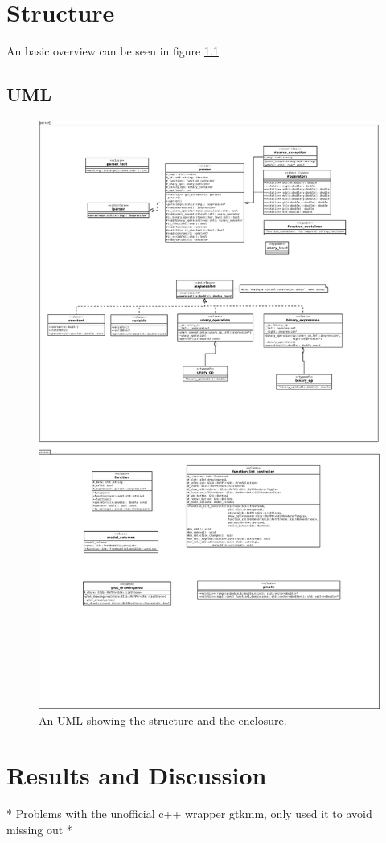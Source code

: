 \documentclass[a4paper,11pt]{kth-mag}
\begin{document}
\chapter{Structure}
An basic overview can be seen in figure \ref{fig:UML}
\section{UML}
\begin{figure}[ht]
    \begin{center}
        \includegraphics[width=\textwidth]{uml.pdf}
        \caption{\small{An UML showing the structure and the enclosure.}}\label{fig:UML}
    \end{center}
\end{figure}




\chapter{Results and Discussion}
* Problems with the unofficial c++ wrapper gtkmm, only used it to avoid missing out 
*
\end{document}
